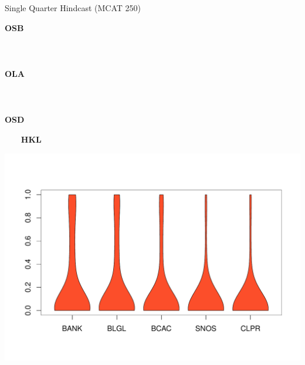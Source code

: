 \documentclass[ xcolor = pdftex, dvipsnames, table ]{beamer}
\begin{document}
\begin{frame}{Single Quarter Hindcast (MCAT 250)}
\hspace*{-1cm}
\begin{minipage}{0.09\textwidth}
\textbf{OSB}\\\\\\\\%
\textbf{OLA}\\\\\\\\%
\textbf{OSD}
\end{minipage}
\hspace*{-0.5cm}
\begin{minipage}{0.29\textwidth}
\begin{center}
$~~~~~~~~~$\textbf{HKL}
\end{center}
\vspace*{-0.75cm}
\includegraphics[height=0.36\textheight]{../pictures/vioOSBHKL.pdf}\\
\vspace*{-1.3cm}

\end{minipage}
\end{frame}
\end{document}
